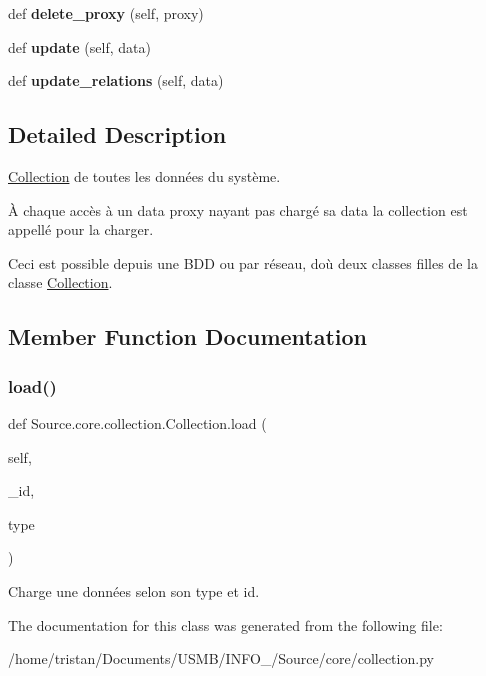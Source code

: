 \begin{DoxyCompactItemize}
def {\bfseries delete\+\_\+proxy} (self, proxy)
\item 
\mbox{\label{classSource_1_1core_1_1collection_1_1Collection_a2b16760f8357a116183e41b4aaa27881}} 
def {\bfseries update} (self, data)
\item 
\mbox{\label{classSource_1_1core_1_1collection_1_1Collection_a113774e3faf43823fd27a40b2435c276}} 
def {\bfseries update\+\_\+relations} (self, data)
\end{DoxyCompactItemize}


\subsection{Detailed Description}
\mbox{\hyperlink{classSource_1_1core_1_1collection_1_1Collection}{Collection}} de toutes les données du système. 

À chaque accès à un data proxy n\textquotesingle{}ayant pas chargé sa data la collection est appellé pour la charger.

Ceci est possible depuis une B\+DD ou par réseau, d\textquotesingle{}où deux classes filles de la classe \mbox{\hyperlink{classSource_1_1core_1_1collection_1_1Collection}{Collection}}. 

\subsection{Member Function Documentation}
\mbox{\label{classSource_1_1core_1_1collection_1_1Collection_a916198d63b982729e8fd286414436392}} 
\subsubsection{\texorpdfstring{load()}{load()}}
{\footnotesize\ttfamily def Source.\+core.\+collection.\+Collection.\+load (\begin{DoxyParamCaption}\item[{}]{self,  }\item[{}]{\+\_\+id,  }\item[{}]{type }\end{DoxyParamCaption})}



Charge une données selon son type et id. 



The documentation for this class was generated from the following file\+:\begin{DoxyCompactItemize}
\item 
/home/tristan/\+Documents/\+U\+S\+M\+B/\+I\+N\+F\+O\+\_/\+Source/core/collection.\+py\end{DoxyCompactItemize}
